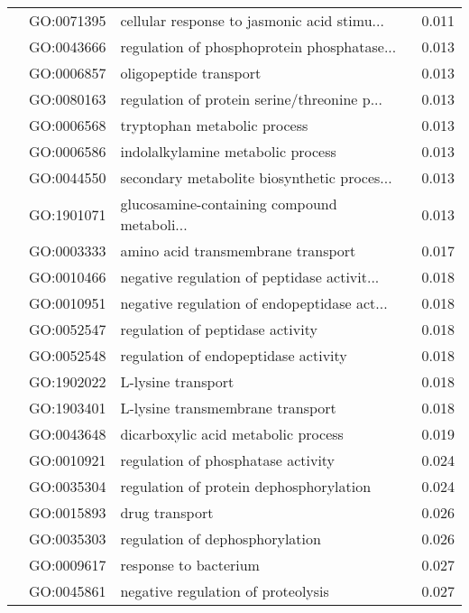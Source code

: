 \begin{longtable}{lllr}
   & GO:0071395 &  cellular response to jasmonic acid stimu... &         0.011 \\
   & GO:0043666 &  regulation of phosphoprotein phosphatase... &         0.013 \\
   & GO:0006857 &                       oligopeptide transport &         0.013 \\
   & GO:0080163 &  regulation of protein serine/threonine p... &         0.013 \\
   & GO:0006568 &                 tryptophan metabolic process &         0.013 \\
   & GO:0006586 &            indolalkylamine metabolic process &         0.013 \\
   & GO:0044550 &  secondary metabolite biosynthetic proces... &         0.013 \\
   & GO:1901071 &  glucosamine-containing compound metaboli... &         0.013 \\
   & GO:0003333 &           amino acid transmembrane transport &         0.017 \\
   & GO:0010466 &  negative regulation of peptidase activit... &         0.018 \\
   & GO:0010951 &  negative regulation of endopeptidase act... &         0.018 \\
   & GO:0052547 &             regulation of peptidase activity &         0.018 \\
   & GO:0052548 &         regulation of endopeptidase activity &         0.018 \\
   & GO:1902022 &                           L-lysine transport &         0.018 \\
   & GO:1903401 &             L-lysine transmembrane transport &         0.018 \\
   & GO:0043648 &          dicarboxylic acid metabolic process &         0.019 \\
   & GO:0010921 &           regulation of phosphatase activity &         0.024 \\
   & GO:0035304 &      regulation of protein dephosphorylation &         0.024 \\
   & GO:0015893 &                               drug transport &         0.026 \\
   & GO:0035303 &              regulation of dephosphorylation &         0.026 \\
   & GO:0009617 &                        response to bacterium &         0.027 \\
   & GO:0045861 &           negative regulation of proteolysis &         0.027 \\

\end{longtable}
